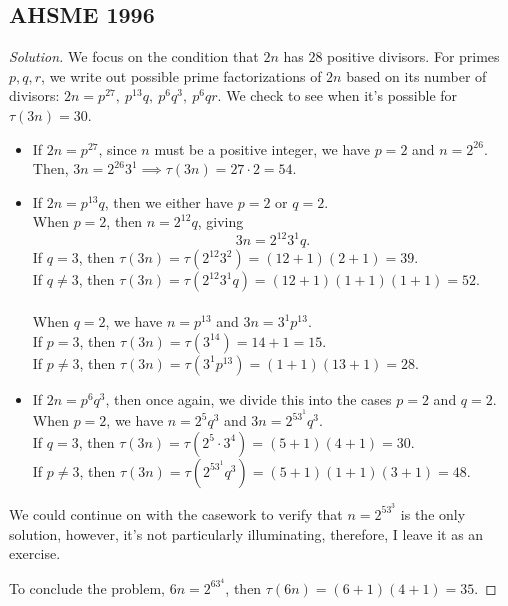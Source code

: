 \subsection{AHSME 1996}
\begin{proof}[Solution] We focus on the condition that $2n$ has $28$ positive divisors. For primes $p, q, r$, we write out possible prime factorizations of $2n$ based on its number of divisors: $2n= p^{27},\: p^{13}q,\: p^6q^3,\: p^6qr.$ We check to see when it's possible for $\tau(3n)=30$.

\begin{itemize} 
\item If $2n=p^{27}$, since $n$ must be a positive integer, we have $p=2$ and $n=2^{26}$. Then, $3n=2^{26}3^1\implies \tau(3n)=27\cdot 2=54.$ 

\item If $2n=p^{13}q$, then we either have $p=2$ or $q=2$.\\ \color{blue} When $p=2$\color{black}, then $n=2^{12}q$, giving $$3n=2^{12}3^1q.$$ If $q=3$, then $\tau(3n)=\tau(2^{12}3^2)=(12+1)(2+1)=39$. \\ If $q\neq 3$, then $\tau(3n)=\tau(2^{12}3^1q)=(12+1)(1+1)(1+1)=52.$ \\ \\ \color{blue} When $q=2$\color{black}, we have $n=p^{13}$ and $3n=3^1p^{13}$. \\ If $p=3$, then $\tau(3n)=\tau(3^{14})=14+1=15$. \\ If $p\neq 3$, then $\tau(3n)=\tau(3^1p^{13})=(1+1)(13+1)=28$. 
\clearpage

\item If $2n=p^6q^3$, then once again, we divide this into the cases $p=2$ and $q=2$. \\  \color{blue} When $p=2$\color{black}, we have $n=2^5q^3$ and $3n=2^53^1q^3$. \\
\color{ForestGreen} If $q=3$, then $\tau(3n)=\tau(2^5\cdot 3^4)=(5+1)(4+1)=30$. \\
\color{black} If $p\neq 3$, then $\tau(3n)=\tau(2^53^1q^3)=(5+1)(1+1)(3+1)=48$.
\end{itemize}
We could continue on with the casework to verify that $n=2^53^3$ is the only solution, however, it's not particularly illuminating, therefore, I leave it as an exercise.

To conclude the problem, $6n=2^63^4$, then $\tau(6n)=\left(6+1\right)\left(4+1\right)=\boxed{35}$. \end{proof}

\clearpage

